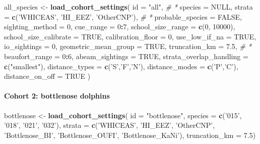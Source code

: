 \documentclass[
]{book}
\newenvironment{Shaded}{\begin{snugshade}}{\end{snugshade}}
\newcommand{\CommentTok}[1]{\textcolor[rgb]{0.56,0.35,0.01}{\textit{#1}}}
\newcommand{\DataTypeTok}[1]{\textcolor[rgb]{0.13,0.29,0.53}{#1}}
\newcommand{\DecValTok}[1]{\textcolor[rgb]{0.00,0.00,0.81}{#1}}
\newcommand{\FloatTok}[1]{\textcolor[rgb]{0.00,0.00,0.81}{#1}}
\newcommand{\KeywordTok}[1]{\textcolor[rgb]{0.13,0.29,0.53}{\textbf{#1}}}
\newcommand{\NormalTok}[1]{#1}
\newcommand{\OperatorTok}[1]{\textcolor[rgb]{0.81,0.36,0.00}{\textbf{#1}}}
\newcommand{\OtherTok}[1]{\textcolor[rgb]{0.56,0.35,0.01}{#1}}
\newcommand{\StringTok}[1]{\textcolor[rgb]{0.31,0.60,0.02}{#1}}
\begin{document}
\begin{Shaded}
\begin{Highlighting}[]
\NormalTok{all_species <-}\StringTok{ }\KeywordTok{load_cohort_settings}\NormalTok{(}
  \DataTypeTok{id =} \StringTok{"all"}\NormalTok{, }\CommentTok{# *}
  \DataTypeTok{species =} \OtherTok{NULL}\NormalTok{, }
  \DataTypeTok{strata =} \KeywordTok{c}\NormalTok{(}\StringTok{'WHICEAS'}\NormalTok{, }\StringTok{'HI_EEZ'}\NormalTok{, }\StringTok{'OtherCNP'}\NormalTok{), }\CommentTok{# *}
  \DataTypeTok{probable_species =} \OtherTok{FALSE}\NormalTok{,}
  \DataTypeTok{sighting_method =} \DecValTok{0}\NormalTok{,}
  \DataTypeTok{cue_range =} \DecValTok{0}\OperatorTok{:}\DecValTok{7}\NormalTok{,}
  \DataTypeTok{school_size_range =} \KeywordTok{c}\NormalTok{(}\DecValTok{0}\NormalTok{, }\DecValTok{10000}\NormalTok{),}
  \DataTypeTok{school_size_calibrate =} \OtherTok{TRUE}\NormalTok{,}
  \DataTypeTok{calibration_floor =} \DecValTok{0}\NormalTok{,}
  \DataTypeTok{use_low_if_na =} \OtherTok{TRUE}\NormalTok{,}
  \DataTypeTok{io_sightings =} \DecValTok{0}\NormalTok{,}
  \DataTypeTok{geometric_mean_group =} \OtherTok{TRUE}\NormalTok{,}
  \DataTypeTok{truncation_km =} \FloatTok{7.5}\NormalTok{, }\CommentTok{# *}
  \DataTypeTok{beaufort_range =} \DecValTok{0}\OperatorTok{:}\DecValTok{6}\NormalTok{,}
  \DataTypeTok{abeam_sightings =} \OtherTok{TRUE}\NormalTok{,}
  \DataTypeTok{strata_overlap_handling =} \KeywordTok{c}\NormalTok{(}\StringTok{"smallest"}\NormalTok{),}
  \DataTypeTok{distance_types =} \KeywordTok{c}\NormalTok{(}\StringTok{'S'}\NormalTok{,}\StringTok{'F'}\NormalTok{,}\StringTok{'N'}\NormalTok{),}
  \DataTypeTok{distance_modes =} \KeywordTok{c}\NormalTok{(}\StringTok{'P'}\NormalTok{,}\StringTok{'C'}\NormalTok{),}
  \DataTypeTok{distance_on_off =} \OtherTok{TRUE}
\NormalTok{)}
\end{Highlighting}
\end{Shaded}

\hypertarget{cohort-2-bottlenose-dolphins}{%
\paragraph{Cohort 2: bottlenose dolphins}\label{cohort-2-bottlenose-dolphins}}

\begin{Shaded}
\begin{Highlighting}[]
\NormalTok{bottlenose <-}\StringTok{ }\KeywordTok{load_cohort_settings}\NormalTok{(}
  \DataTypeTok{id =} \StringTok{"bottlenose"}\NormalTok{,}
  \DataTypeTok{species =} \KeywordTok{c}\NormalTok{(}\StringTok{'015'}\NormalTok{, }\StringTok{'018'}\NormalTok{, }\StringTok{'021'}\NormalTok{, }\StringTok{'032'}\NormalTok{),}
  \DataTypeTok{strata =} \KeywordTok{c}\NormalTok{(}\StringTok{'WHICEAS'}\NormalTok{, }\StringTok{'HI_EEZ'}\NormalTok{, }\StringTok{'OtherCNP'}\NormalTok{,}
             \StringTok{'Bottlenose_BI'}\NormalTok{, }\StringTok{'Bottlenose_OUFI'}\NormalTok{, }\StringTok{'Bottlenose_KaNi'}\NormalTok{),}
  \DataTypeTok{truncation_km =} \FloatTok{7.5}\NormalTok{)}
\end{Highlighting}
\end{Shaded}
\end{document}
